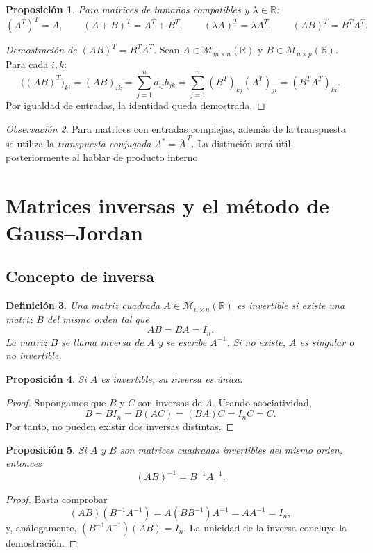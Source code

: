 \documentclass[12pt]{article}
\newtheorem{definicion}{Definición}[section]
\newtheorem{proposicion}[definicion]{Proposición}
\theoremstyle{remark}
\newtheorem{observacion}[definicion]{Observación}
\newcommand{\R}{\mathbb{R}}
\newcommand{\Mat}[2]{\mathcal{M}_{#1\times #2}}
\begin{document}
\begin{proposicion}
Para matrices de tamaños compatibles y $\lambda\in\R$:
\[
(A^T)^T=A,\qquad(A+B)^T=A^T+B^T,\qquad
(\lambda A)^T=\lambda A^T,\qquad (AB)^T=B^TA^T.
\]
\end{proposicion}
\begin{proof}[Demostración de $(AB)^T=B^TA^T$]
Sean $A\in\Mat{m}{n}(\R)$ y $B\in\Mat{n}{p}(\R)$. Para cada $i,k$:
\[
\bigl((AB)^T\bigr)_{ki}=(AB)_{ik}
=\sum_{j=1}^{n}a_{ij}b_{jk}
=\sum_{j=1}^{n}(B^T)_{kj}(A^T)_{ji}
=(B^TA^T)_{ki}.
\]
Por igualdad de entradas, la identidad queda demostrada.
\end{proof}

\begin{observacion}
Para matrices con entradas complejas, además de la transpuesta se utiliza la \emph{transpuesta conjugada} $A^*=\overline{A}^{\,T}$. La distinción será útil posteriormente al hablar de producto interno. 
\end{observacion}

\section{Matrices inversas y el método de Gauss--Jordan}
\subsection*{Concepto de inversa}
\begin{definicion}
Una matriz cuadrada $A\in\Mat{n}{n}(\R)$ es \emph{invertible} si existe una matriz $B$ del mismo orden tal que
\[
AB=BA=I_n.
\]
La matriz $B$ se llama \emph{inversa} de $A$ y se escribe $A^{-1}$. Si no existe, $A$ es \emph{singular} o \emph{no invertible}.
\end{definicion}

\begin{proposicion}
Si $A$ es invertible, su inversa es única.
\end{proposicion}
\begin{proof}
Supongamos que $B$ y $C$ son inversas de $A$. Usando asociatividad,
\[
B=BI_n=B(AC)=(BA)C=I_nC=C.
\]
Por tanto, no pueden existir dos inversas distintas.
\end{proof}

\begin{proposicion}
Si $A$ y $B$ son matrices cuadradas invertibles del mismo orden, entonces
\[
\boxed{(AB)^{-1}=B^{-1}A^{-1}.}
\]
\end{proposicion}
\begin{proof}
Basta comprobar
\[
(AB)(B^{-1}A^{-1})=A(BB^{-1})A^{-1}=AA^{-1}=I_n,
\]
y, análogamente, $(B^{-1}A^{-1})(AB)=I_n$. La unicidad de la inversa concluye la demostración.
\end{proof}
\end{document}
